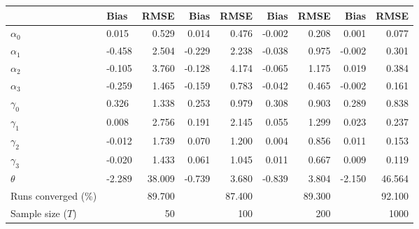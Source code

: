
\begin{tabular}[t]{llrrrrrrr}
\toprule
  & Bias & RMSE & Bias & RMSE & Bias & RMSE & Bias & RMSE\\
\midrule
$\alpha_{0}$ & 0.015 & 0.529 & 0.014 & 0.476 & -0.002 & 0.208 & 0.001 & 0.077\\
$\alpha_{1}$ & -0.458 & 2.504 & -0.229 & 2.238 & -0.038 & 0.975 & -0.002 & 0.301\\
$\alpha_{2}$ & -0.105 & 3.760 & -0.128 & 4.174 & -0.065 & 1.175 & 0.019 & 0.384\\
$\alpha_{3}$ & -0.259 & 1.465 & -0.159 & 0.783 & -0.042 & 0.465 & -0.002 & 0.161\\
$\gamma_{0}$ & 0.326 & 1.338 & 0.253 & 0.979 & 0.308 & 0.903 & 0.289 & 0.838\\
$\gamma_{1}$ & 0.008 & 2.756 & 0.191 & 2.145 & 0.055 & 1.299 & 0.023 & 0.237\\
$\gamma_{2}$ & -0.012 & 1.739 & 0.070 & 1.200 & 0.004 & 0.856 & 0.011 & 0.153\\
$\gamma_{3}$ & -0.020 & 1.433 & 0.061 & 1.045 & 0.011 & 0.667 & 0.009 & 0.119\\
$\theta$ & -2.289 & 38.009 & -0.739 & 3.680 & -0.839 & 3.804 & -2.150 & 46.564\\
Runs converged (\%) &  & 89.700 &  & 87.400 &  & 89.300 &  & 92.100\\
Sample size ($T$) &  & 50 &  & 100 &  & 200 &  & 1000\\
\bottomrule
\end{tabular}
